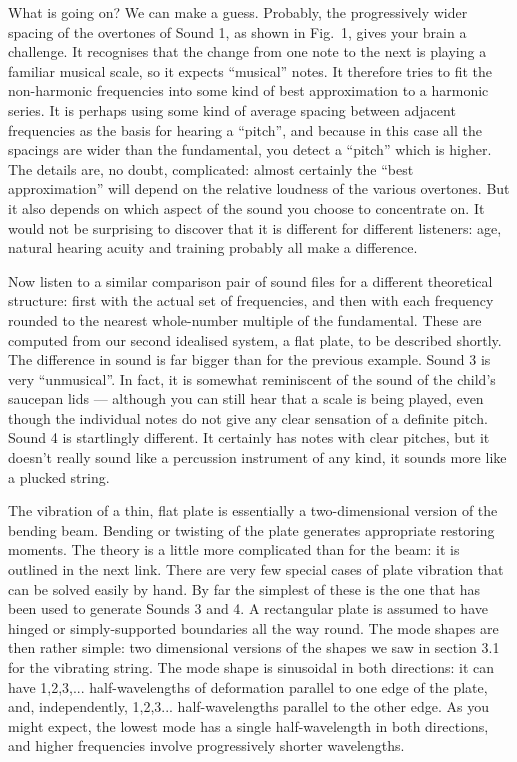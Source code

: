   What is going on? We can make a guess. Probably, the progressively wider 
  spacing of the overtones of Sound 1, as shown in Fig.\ 1, gives your brain a 
  challenge. It recognises that the change from one note to the next is playing 
  a familiar musical scale, so it expects ``musical'' notes. It therefore tries 
  to fit the non-harmonic frequencies into some kind of best approximation to a 
  harmonic series. It is perhaps using some kind of average spacing between 
  adjacent frequencies as the basis for hearing a ``pitch'', and because in 
  this case all the spacings are wider than the fundamental, you detect a 
  ``pitch'' which is higher. The details are, no doubt, complicated: almost 
  certainly the ``best approximation'' will depend on the relative loudness of 
  the various overtones. But it also depends on which aspect of the sound you 
  choose to concentrate on. It would not be surprising to discover that it is 
  different for different listeners: age, natural hearing acuity and training 
  probably all make a difference. 

  Now listen to a similar comparison pair of sound files for a different 
  theoretical structure: first with the actual set of frequencies, and then 
  with each frequency rounded to the nearest whole-number multiple of the 
  fundamental. These are computed from our second idealised system, a flat 
  plate, to be described shortly. The difference in sound is far bigger than 
  for the previous example. Sound 3 is very ``unmusical''. In fact, it is 
  somewhat reminiscent of the sound of the child's saucepan lids --- although 
  you can still hear that a scale is being played, even though the individual 
  notes do not give any clear sensation of a definite pitch. Sound 4 is 
  startlingly different. It certainly has notes with clear pitches, but it 
  doesn't really sound like a percussion instrument of any kind, it sounds more 
  like a plucked string. 

\audio{}

\audio{}

  The vibration of a thin, flat plate is essentially a two-dimensional version 
  of the bending beam. Bending or twisting of the plate generates appropriate 
  restoring moments. The theory is a little more complicated than for the beam: 
  it is outlined in the next link. There are very few special cases of plate 
  vibration that can be solved easily by hand. By far the simplest of these is 
  the one that has been used to generate Sounds 3 and 4. A rectangular plate is 
  assumed to have hinged or simply-supported boundaries all the way round. The 
  mode shapes are then rather simple: two dimensional versions of the shapes we 
  saw in section 3.1 for the vibrating string. The mode shape is sinusoidal in 
  both directions: it can have 1,2,3,... half-wavelengths of deformation 
  parallel to one edge of the plate, and, independently, 1,2,3... 
  half-wavelengths parallel to the other edge. As you might expect, the lowest 
  mode has a single half-wavelength in both directions, and higher frequencies 
  involve progressively shorter wavelengths. 

